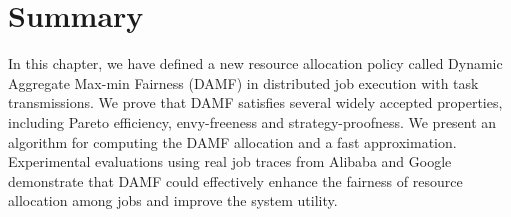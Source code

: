 \begin{table}[!ht]
  \caption{Average computation time (s) of $\text{DAMF}\_a$}
  \label{tab:computation_time_m}
  \centering
\end{table}

\section{Summary}
\label{sec:ch3summary}
In this chapter, we have defined a new resource allocation policy called Dynamic Aggregate Max-min Fairness (DAMF) in distributed job execution with task transmissions. We prove that DAMF satisfies several widely accepted properties, including Pareto efficiency, envy-freeness and strategy-proofness. We present an algorithm for computing the DAMF allocation and a fast approximation. Experimental evaluations using real job traces from Alibaba and Google demonstrate that DAMF could effectively enhance the fairness of resource allocation among jobs and improve the system utility. %

